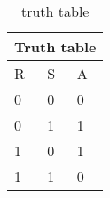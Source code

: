 \begin{table}[h]
	\begin{center}
\begin{tabular}{|p{2cm}|p{2cm}|p{2cm}|}
\hline
\multicolumn{3}{|c|}{Truth table}\\
\hline
R& S& A\\
\hline
0& 0& 0\\
\hline
0& 1& 1\\
\hline
1& 0& 1\\
\hline
1& 1& 0\\
\hline
\end{tabular}
	\end{center}
\caption{truth table}
\label{table 2}
\end{table}
